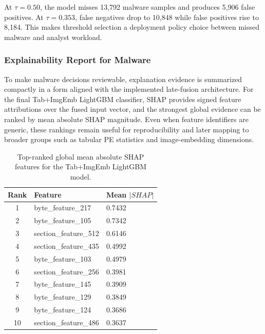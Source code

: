 \documentclass[conference]{IEEEtran}
\begin{document}
At $\tau=0.50$, the model misses 13,792 malware samples and produces 5,906 false positives.
At $\tau=0.353$, false negatives drop to 10,848 while false positives rise to 8,184.
This makes threshold selection a deployment policy choice between missed malware and analyst workload.

\subsubsection{Explainability Report for Malware}

To make malware decisions reviewable, explanation evidence is summarized compactly in a form aligned with the implemented late-fusion architecture.
For the final Tab+ImgEmb LightGBM classifier, SHAP provides signed feature attributions over the fused input vector, and the strongest global evidence can be ranked by mean absolute SHAP magnitude.
Even when feature identifiers are generic, these rankings remain useful for reproducibility and later mapping to broader groups such as tabular PE statistics and image-embedding dimensions.

\iffalse
\begin{table}[htbp]
\centering
\caption{Top-ranked global mean absolute SHAP features for the Tab+ImgEmb LightGBM model.}
\label{tab:feature_rank}

\begin{tabularx}{\columnwidth}{clX} %
\toprule
\textbf{Rank} & \textbf{Feature} & \textbf{Mean $|SHAP|$} \\
\midrule
1  & byte\_feature\_217    & 0.7432 \\
2  & byte\_feature\_105    & 0.7342 \\
3  & section\_feature\_512 & 0.6146 \\
4  & section\_feature\_435 & 0.4992 \\
5  & byte\_feature\_103    & 0.4979 \\
6  & section\_feature\_256 & 0.3981 \\
7  & byte\_feature\_145    & 0.3909 \\
8  & byte\_feature\_129    & 0.3849 \\
9  & byte\_feature\_124    & 0.3686 \\
10 & section\_feature\_486 & 0.3637 \\
\bottomrule
\end{tabularx}

\end{table}
\end{document}
